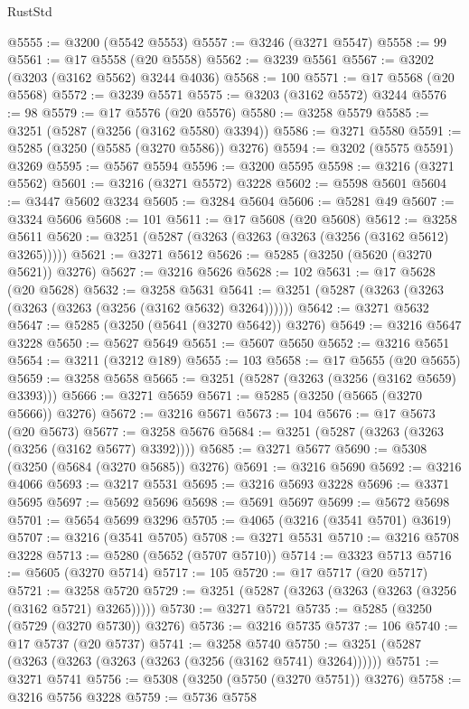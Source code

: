 \begin{lexlean}{RustStd}
\begin{coremodule}
@5555 := @3200 (@5542 @5553)
@5557 := @3246 (@3271 @5547)
@5558 := 99
@5561 := @17 @5558 (@20 @5558)
@5562 := @3239 @5561
@5567 := @3202 (@3203 (@3162 @5562) @3244 @4036)
@5568 := 100
@5571 := @17 @5568 (@20 @5568)
@5572 := @3239 @5571
@5575 := @3203 (@3162 @5572) @3244
@5576 := 98
@5579 := @17 @5576 (@20 @5576)
@5580 := @3258 @5579
@5585 := @3251 (@5287 (@3256 (@3162 @5580) @3394))
@5586 := @3271 @5580
@5591 := @5285 (@3250 (@5585 (@3270 @5586)) @3276)
@5594 := @3202 (@5575 @5591) @3269
@5595 := @5567 @5594
@5596 := @3200 @5595
@5598 := @3216 (@3271 @5562)
@5601 := @3216 (@3271 @5572) @3228
@5602 := @5598 @5601
@5604 := @3447 @5602 @3234
@5605 := @3284 @5604
@5606 := @5281 @49
@5607 := @3324 @5606
@5608 := 101
@5611 := @17 @5608 (@20 @5608)
@5612 := @3258 @5611
@5620 := @3251 (@5287 (@3263 (@3263 (@3263 (@3256 (@3162 @5612) @3265)))))
@5621 := @3271 @5612
@5626 := @5285 (@3250 (@5620 (@3270 @5621)) @3276)
@5627 := @3216 @5626
@5628 := 102
@5631 := @17 @5628 (@20 @5628)
@5632 := @3258 @5631
@5641 := @3251 (@5287 (@3263 (@3263 (@3263 (@3263 (@3256 (@3162 @5632) @3264))))))
@5642 := @3271 @5632
@5647 := @5285 (@3250 (@5641 (@3270 @5642)) @3276)
@5649 := @3216 @5647 @3228
@5650 := @5627 @5649
@5651 := @5607 @5650
@5652 := @3216 @5651
@5654 := @3211 (@3212 @189)
@5655 := 103
@5658 := @17 @5655 (@20 @5655)
@5659 := @3258 @5658
@5665 := @3251 (@5287 (@3263 (@3256 (@3162 @5659) @3393)))
@5666 := @3271 @5659
@5671 := @5285 (@3250 (@5665 (@3270 @5666)) @3276)
@5672 := @3216 @5671
@5673 := 104
@5676 := @17 @5673 (@20 @5673)
@5677 := @3258 @5676
@5684 := @3251 (@5287 (@3263 (@3263 (@3256 (@3162 @5677) @3392))))
@5685 := @3271 @5677
@5690 := @5308 (@3250 (@5684 (@3270 @5685)) @3276)
@5691 := @3216 @5690
@5692 := @3216 @4066
@5693 := @3217 @5531
@5695 := @3216 @5693 @3228
@5696 := @3371 @5695
@5697 := @5692 @5696
@5698 := @5691 @5697
@5699 := @5672 @5698
@5701 := @5654 @5699 @3296
@5705 := @4065 (@3216 (@3541 @5701) @3619)
@5707 := @3216 (@3541 @5705)
@5708 := @3271 @5531
@5710 := @3216 @5708 @3228
@5713 := @5280 (@5652 (@5707 @5710))
@5714 := @3323 @5713
@5716 := @5605 (@3270 @5714)
@5717 := 105
@5720 := @17 @5717 (@20 @5717)
@5721 := @3258 @5720
@5729 := @3251 (@5287 (@3263 (@3263 (@3263 (@3256 (@3162 @5721) @3265)))))
@5730 := @3271 @5721
@5735 := @5285 (@3250 (@5729 (@3270 @5730)) @3276)
@5736 := @3216 @5735
@5737 := 106
@5740 := @17 @5737 (@20 @5737)
@5741 := @3258 @5740
@5750 := @3251 (@5287 (@3263 (@3263 (@3263 (@3263 (@3256 (@3162 @5741) @3264))))))
@5751 := @3271 @5741
@5756 := @5308 (@3250 (@5750 (@3270 @5751)) @3276)
@5758 := @3216 @5756 @3228
@5759 := @5736 @5758

\end{coremodule}
\end{lexlean}
